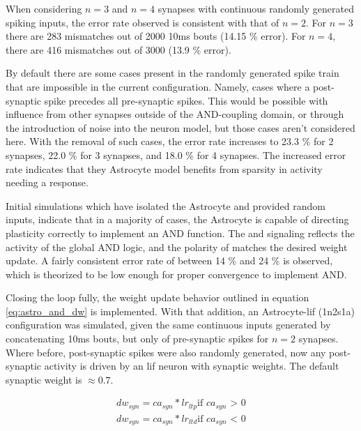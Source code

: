 
When considering $n=3$ and $n=4$ synapses with continuous randomly generated
spiking inputs, the error rate observed is consistent with that of $n=2$. For
$n=3$ there are 283 mismatches out of 2000 10ms bouts (14.15 \% error). For
$n=4$, there are 416 mismatches out of 3000 (13.9 \% error).

By default there are some cases present in the randomly generated spike train
that are impossible in the current configuration. Namely, cases where a
post-synaptic spike precedes all pre-synaptic spikes. This would be possible
with influence from other synapses outside of the AND-coupling domain, or
through the introduction of noise into the neuron model, but those cases aren't
considered here. With the removal of such cases, the error rate increases to
23.3 \% for 2 synapses, 22.0 \% for 3 synapses, and 18.0 \% for 4 synapses. The
increased error rate indicates that they Astrocyte model benefits from sparsity
in activity needing a response.

Initial simulations which have isolated the Astrocyte and provided random
inputs, indicate that in a majority of cases, the Astrocyte is capable of
directing plasticity correctly to implement an AND function. The
\dser and \serca signaling reflects the activity of the global AND logic, and
the polarity of \dser matches the desired weight update. A fairly consistent
error rate of between 14 \% and 24 \% is observed, which is theorized to be low
enough for proper convergence to implement AND.

Closing the loop fully, the weight update behavior outlined in equation
\ref{eq:astro_and_dw} is implemented. With that addition, an Astrocyte-\Gls{lif} (1n2s1a)
configuration was simulated, given the same continuous inputs generated by
concatenating 10ms bouts, but only of pre-synaptic spikes for $n=2$
synapses. Where before, post-synaptic spikes were also randomly generated, now
any post-synaptic activity is driven by an \Gls{lif} neuron with synaptic weights.
The default synaptic weight is $\approx 0.7$.

\begin{align}
  dw_{syn} = ca_{syn} * lr_{ltp} \text{if $ca_{syn}$ > 0} \\
  dw_{syn} = ca_{syn} * lr_{ltd} \text{if $ca_{syn}$ < 0} \\
\end{align}

